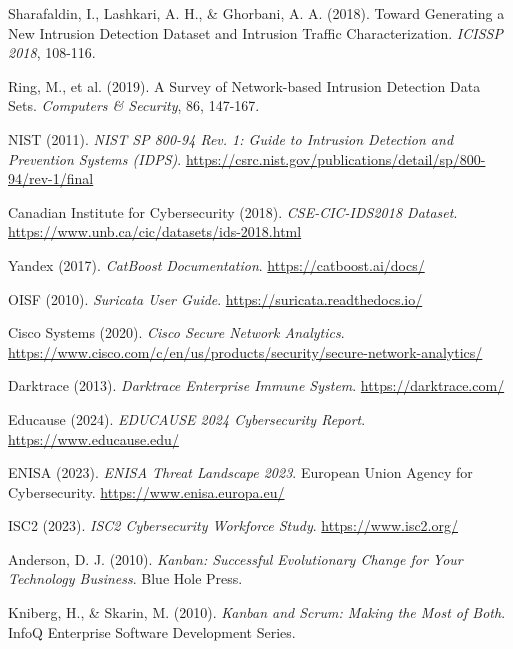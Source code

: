 \documentclass[12pt, letterpaper, oneside]{report}
\begin{document}
\begin{enumerate}[leftmargin=*, label={[\arabic*]}]
  \item Sharafaldin, I., Lashkari, A. H., \& Ghorbani, A. A. (2018). Toward Generating a New Intrusion Detection Dataset and Intrusion Traffic Characterization. \textit{ICISSP 2018}, 108-116.

  \item Ring, M., et al. (2019). A Survey of Network-based Intrusion Detection Data Sets. \textit{Computers \& Security}, 86, 147-167.

  \item NIST (2011). \textit{NIST SP 800-94 Rev. 1: Guide to Intrusion Detection and Prevention Systems (IDPS)}. \url{https://csrc.nist.gov/publications/detail/sp/800-94/rev-1/final}

  \item Canadian Institute for Cybersecurity (2018). \textit{CSE-CIC-IDS2018 Dataset}. \url{https://www.unb.ca/cic/datasets/ids-2018.html}

  \item Yandex (2017). \textit{CatBoost Documentation}. \url{https://catboost.ai/docs/}

  \item OISF (2010). \textit{Suricata User Guide}. \url{https://suricata.readthedocs.io/}

  \item Cisco Systems (2020). \textit{Cisco Secure Network Analytics}. \url{https://www.cisco.com/c/en/us/products/security/secure-network-analytics/}

  \item Darktrace (2013). \textit{Darktrace Enterprise Immune System}. \url{https://darktrace.com/}

  \item Educause (2024). \textit{EDUCAUSE 2024 Cybersecurity Report}. \url{https://www.educause.edu/}

  \item ENISA (2023). \textit{ENISA Threat Landscape 2023}. European Union Agency for Cybersecurity. \url{https://www.enisa.europa.eu/}

  \item ISC2 (2023). \textit{ISC2 Cybersecurity Workforce Study}. \url{https://www.isc2.org/}

  \item Anderson, D. J. (2010). \textit{Kanban: Successful Evolutionary Change for Your Technology Business}. Blue Hole Press.

  \item Kniberg, H., \& Skarin, M. (2010). \textit{Kanban and Scrum: Making the Most of Both}. InfoQ Enterprise Software Development Series.


\end{enumerate}
\end{document}
